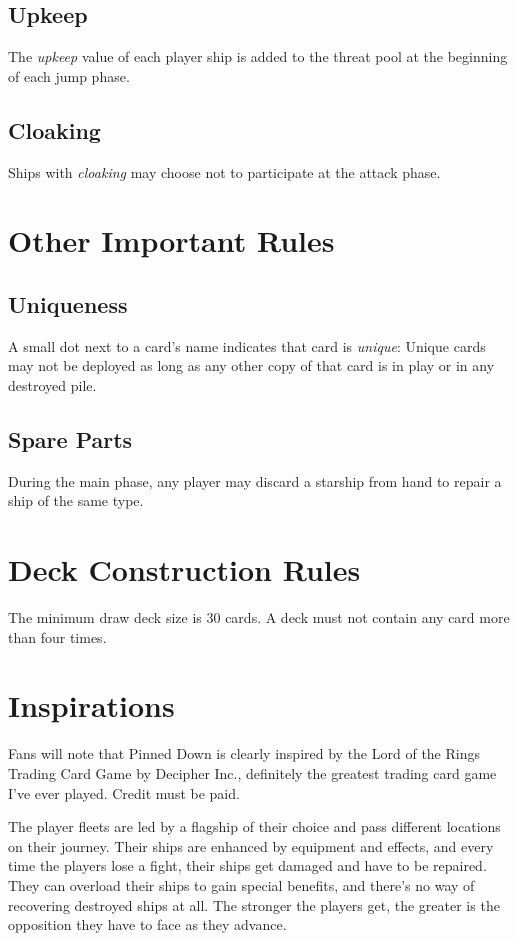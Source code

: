 \documentclass[11pt, a4paper]{article}
\begin{document}
\subsection{Upkeep}
\label{upkeep}

The \emph{upkeep} value of each player ship is added to the threat pool at the
beginning of each jump phase.

\subsection{Cloaking}

Ships with \emph{cloaking} may choose not to participate at the attack phase.


\section{Other Important Rules}
\subsection{Uniqueness}

A small dot next to a card's name indicates that card is \emph{unique}: Unique
cards may not be deployed as long as any other copy of that card is in play or
in any destroyed pile.

\subsection{Spare Parts}

During the main phase, any player may discard a starship from hand to repair
a ship of the same type.

\section{Deck Construction Rules}

The minimum draw deck size is 30 cards. A deck must not contain any card more
than four times.

\section{Inspirations}

Fans will note that Pinned Down is clearly inspired by the Lord of the Rings
Trading Card Game by Decipher Inc., definitely the greatest trading card game
I've ever played. Credit must be paid.

The player fleets are led by a flagship of their choice and pass different
locations on their journey. Their ships are enhanced by equipment and effects,
and every time the players lose a fight, their ships get damaged and have to be
repaired. They can overload their ships to gain special benefits, and there's no
way of recovering destroyed ships at all. The stronger the players get, the
greater is the opposition they have to face as they advance.
\end{document}
